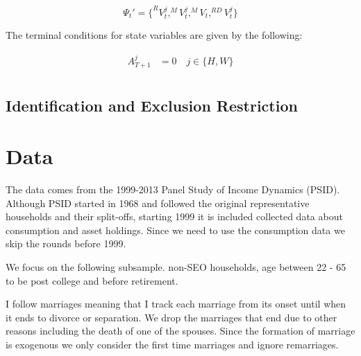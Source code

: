 \begin{equation*}
\Psi_t'  =\{ ^{R}V_t^j, ^MV^j_t, ^{M}V_t, ^{RD}V_t^j\}
\end{equation*}

\noindent The terminal conditions for state variables are given by the following: 

\begin{align*}
A_{T+1}^j &= 0  \quad j \in \{H, W\} \\ 
\end{align*}

\subsection{Identification and Exclusion Restriction}

\section{Data}
The data comes from the 1999-2013 Panel Study of Income Dynamics (PSID). Although PSID started in 1968 and followed the original representative households and their split-offs, starting 1999 it is included collected data about consumption and asset holdings. Since we need to use the consumption data we skip the rounds before 1999. 

We focus on the following subsample. non-SEO households, age between 22 - 65 to be post college and before retirement. 

I follow marriages meaning that I track each marriage from its onset until when it ends to divorce or separation. We drop the marriages that end due to other reasons including the death of one of the spouses. Since the formation of marriage is exogenous we only consider the first time marriages and ignore remarriages.  \\




\clearpage



